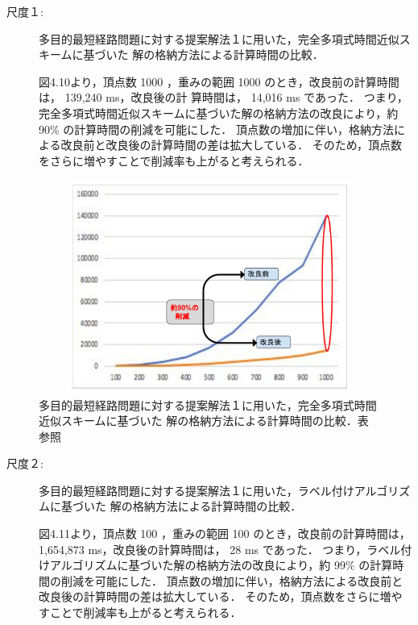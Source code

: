 \documentclass[12pt]{optlab-bachelor}
\begin{document}
\begin{description}
  \item[尺度１:]
  多目的最短経路問題に対する提案解法１に用いた，完全多項式時間近似スキームに基づいた
  解の格納方法による計算時間の比較．

  図4.10より，頂点数 1000 ，重みの範囲 1000 のとき，改良前の計算時間は， 139,240 ms，改良後の計 算時間は， 14,016 ms であった．
  つまり，完全多項式時間近似スキームに基づいた解の格納方法の改良により，約 90\% の計算時間の削減を可能にした．
  頂点数の増加に伴い，格納方法による改良前と改良後の計算時間の差は拡大している．
  そのため，頂点数をさらに増やすことで削減率も上がると考えられる．

\end{description}

\begin{figure}[htbp]
  \centering
  \includegraphics[height=7.0cm , width=15.0cm]{fig/fig13.pdf}
  \caption{多目的最短経路問題に対する提案解法１に用いた，完全多項式時間近似スキームに基づいた
  解の格納方法による計算時間の比較．表　　参照}
\end{figure}


\begin{description}
  \item[尺度２:]
  多目的最短経路問題に対する提案解法１に用いた，ラベル付けアルゴリズムに基づいた
  解の格納方法による計算時間の比較．

  図4.11より，頂点数 100 ，重みの範囲 100 のとき，改良前の計算時間は， 1,654,873 ms，改良後の計算時間は， 28 ms であった．
  つまり，ラベル付けアルゴリズムに基づいた解の格納方法の改良により，約 99\% の計算時間の削減を可能にした．
  頂点数の増加に伴い，格納方法による改良前と改良後の計算時間の差は拡大している．
  そのため，頂点数をさらに増やすことで削減率も上がると考えられる．

\end{description}
\end{document}
